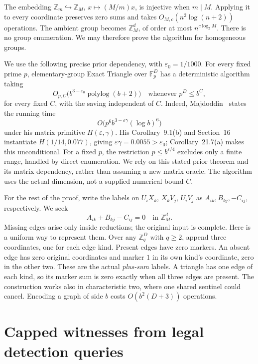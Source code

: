 \documentclass[manuscript,screen,nonacm,11pt]{acmart}
\newcommand{\Z}{\mathbb Z}
\newcommand{\F}{\mathbb F}
\newcommand{\eps}{\varepsilon_0}
\begin{document}
The embedding $\Z_m\hookrightarrow\Z_M$, $x\mapsto(M/m)x$, is injective
when $m\mid M$. Applying it to every coordinate preserves zero sums and
takes $O_{M,c}(n^2\log(n+2))$ operations. The ambient group becomes $\Z_M^d$,
of order at most $n^{c\log_2 M}$. There is no group enumeration. We may
therefore prove the algorithm for homogeneous groups.

We use the following precise prior dependency, with $\eps=1/1000$.
For every fixed prime $p$, elementary-group Exact Triangle over $\F_p^D$
has a deterministic algorithm taking
\begin{equation}\label{eq:backend}
 O_{p,C}\bigl(b^{3-\eps}\operatorname{polylog}(b+2)\bigr)
 \quad\text{whenever }p^D\le b^C,
\end{equation}
for every fixed $C$, with the saving independent of $C$.
Indeed, Majdoddin~\cite[Theorem~21.3]{Maj26} states the running time
\[
 O\bigl(p^6b^{3-\varepsilon\gamma}(\log b)^6\bigr)
\]
under his matrix primitive
$H(\varepsilon,\gamma)$. His Corollary~9.1(b) and Section~16 instantiate
$H(1/14,0.077)$, giving $\varepsilon\gamma=0.0055>\eps$;
Corollary~21.7(a) makes this unconditional. For a fixed $p$, the restriction
$p\le b^{\varepsilon/4}$ excludes only a finite range, handled by direct
enumeration. We rely on this stated prior theorem and its matrix dependency,
rather than assuming a new matrix oracle. The algorithm uses the actual
dimension, not a supplied numerical bound $C$.

For the rest of the proof, write the labels on $U_iX_k$, $X_kV_j$, $U_iV_j$
as $A_{ik},B_{kj},-C_{ij}$, respectively. We seek
\begin{equation}\label{eq:zero}
 A_{ik}+B_{kj}-C_{ij}=0\quad\text{in }\Z_M^d.
\end{equation}
Missing edges arise only inside reductions; the original input is complete.
Here is a uniform way to represent them. Over any $\Z_q^D$ with $q\ge2$,
append three coordinates, one for each edge kind. Present edges have zero
markers. An absent edge has zero original coordinates and marker $1$ in its
own kind's coordinate, zero in the other two. These are the actual
\emph{plus-sum} labels. A triangle has one edge of each kind, so its marker
sum is zero exactly when all three edges are present. The construction
works also in characteristic two, where one shared sentinel could cancel.
Encoding a graph of side $b$ costs $O(b^2(D+3))$ operations.

\section{Capped witnesses from legal detection queries}\label{sec:capped}
\end{document}
